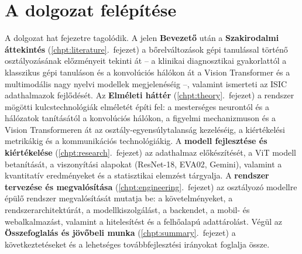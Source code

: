 \section{A dolgozat felépítése}

A dolgozat hat fejezetre tagolódik. A jelen \textbf{Bevezető} után a
\textbf{Szakirodalmi áttekintés} (\ref{chpt:literature}.~fejezet) a
bőrelváltozások gépi tanulással történő osztályozásának előzményeit tekinti át --
a klinikai diagnosztikai gyakorlattól a klasszikus gépi tanuláson és a
konvolúciós hálókon át a Vision Transformer és a multimodális nagy nyelvi
modellek megjelenéséig --, valamint ismerteti az ISIC adathalmazok fejlődését.
Az \textbf{Elméleti háttér} (\ref{chpt:theory}.~fejezet) a rendszer mögötti
kulcstechnológiák elméletét építi fel: a mesterséges neurontól és a hálózatok
tanításától a konvolúciós hálókon, a figyelmi mechanizmuson és a Vision
Transformeren át az osztály-egyensúlytalanság kezeléséig, a kiértékelési
metrikákig és a kommunikációs technológiákig. A \textbf{modell fejlesztése és
kiértékelése} (\ref{chpt:research}.~fejezet) az adathalmaz előkészítését, a ViT modell
betanítását, a viszonyítási alapokat (ResNet-18, EVA02, Gemini), valamint a
kvantitatív eredményeket és a statisztikai elemzést tárgyalja. A \textbf{rendszer
tervezése és megvalósítása} (\ref{chpt:engineering}.~fejezet) az osztályozó modellre épülő rendszer 
megvalósítását mutatja be: a követelményeket, a rendszerarchitektúrát, a
modellkiszolgálást, a backendet, a mobil- és webalkalmazást, valamint a hitelesítést
és a felhőalapú adattárolást.
Végül az \textbf{Összefoglalás és jövőbeli munka} (\ref{chpt:summary}.~fejezet) 
a következtetéseket és a lehetséges továbbfejlesztési irányokat foglalja össze.
